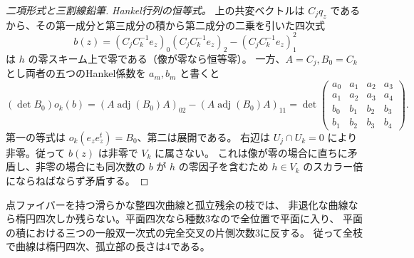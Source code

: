 \begin{proof}[二項形式と三割線鉛筆]
\smallskip
\noindent\textit{Hankel行列の恒等式。}
上の共変ベクトルは $C_jq_z$ であるから、その第一成分と第三成分の積から第二成分の二乗を引いた四次式
\[
 b(z)=(C_jC_k^{-1}e_z)_0(C_jC_k^{-1}e_z)_2-(C_jC_k^{-1}e_z)_1^2
\]
は $h$ の零スキーム上で零である（像が零なら恒等零）。
一方、$A=C_j,B_0=C_k$ とし両者の五つのHankel係数を $a_m,b_m$ と書くと
\[
 (\det B_0)o_k(b)=
 (A\operatorname{adj}(B_0)A)_{02}-(A\operatorname{adj}(B_0)A)_{11}
 =
 \det\!\begin{pmatrix}
 a_0&a_1&a_2&a_3\\a_1&a_2&a_3&a_4\\
 b_0&b_1&b_2&b_3\\b_1&b_2&b_3&b_4
 \end{pmatrix}.
\]
第一の等式は $o_k(e_z e_z^t)=B_0$、第二は展開である。
右辺は $U_j\cap U_k=0$ により非零。従って $b(z)$ は非零で $V_k$ に属さない。
これは像が零の場合に直ちに矛盾し、非零の場合にも同次数の $b$ が $h$ の零因子を含むため
$h\in V_k$ のスカラー倍にならねばならず矛盾する。
\end{proof}

\begin{corollary}
点ファイバーを持つ滑らかな整四次曲線と孤立残余の枝では、
非退化な曲線なら楕円四次しか残らない。平面四次なら種数3なので全位置で平面に入り、
平面の積における三つの一般双一次式の完全交叉の片側次数3に反する。
従って全枝で曲線は楕円四次、孤立部の長さは4である。
\end{corollary}
